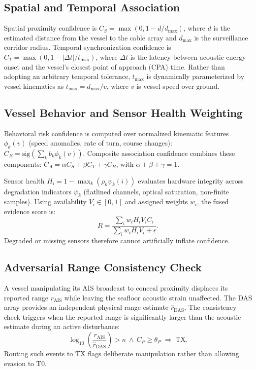 \documentclass[conference]{IEEEtran}
\newcommand{\dstate}[1]{\ensuremath{\mathrm{#1}}}
\begin{document}
\subsection{Spatial and Temporal Association}
Spatial proximity confidence is $C_S = \max(0, 1 - d/d_{\max})$, where $d$ is
the estimated distance from the vessel to the cable array and $d_{\max}$ is the
surveillance corridor radius. Temporal synchronization confidence is
$C_T = \max(0, 1 - |\Delta t| / t_{\max})$, where $\Delta t$ is the latency
between acoustic energy onset and the vessel's closest point of approach
(CPA) time. Rather than adopting an
arbitrary temporal tolerance, $t_{\max}$ is dynamically parameterized by vessel
kinematics as $t_{\max} = d_{\max} / v$, where $v$ is vessel speed over ground.

\subsection{Vessel Behavior and Sensor Health Weighting}
Behavioral risk confidence is computed over normalized kinematic features
$\phi_k(v)$ (speed anomalies, rate of turn, course changes):
$C_B = \mathrm{sig}\!\left(\sum_k b_k \phi_k(v)\right)$. Composite association
confidence combines these components: $C_A = \alpha C_S + \beta C_T + \gamma C_B$,
with $\alpha + \beta + \gamma = 1$.

Sensor health $H_i = 1 - \max_k(\rho_k \psi_k(i))$ evaluates hardware integrity
across degradation indicators $\psi_k$ (flatlined channels, optical saturation,
non-finite samples). Using availability $V_i \in [0, 1]$ and assigned weights
$w_i$, the fused evidence score is:
\begin{equation}
R = \frac{\sum_i w_i H_i V_i C_i}{\sum_i w_i H_i V_i + \epsilon}.
\end{equation}
Degraded or missing sensors therefore cannot artificially inflate confidence.

\subsection{Adversarial Range Consistency Check}
A vessel manipulating its AIS broadcast to conceal proximity displaces its
reported range $r_{\mathrm{AIS}}$ while leaving the seafloor acoustic strain
unaffected. The DAS array provides an independent physical range estimate
$\hat{r}_{\mathrm{DAS}}$. The consistency check triggers when the reported range
is significantly larger than the acoustic estimate during an active disturbance:
\begin{equation}
\log_{10}\!\left(\frac{r_{\mathrm{AIS}}}{\hat{r}_{\mathrm{DAS}}}\right) > \kappa
\ \wedge\ C_P \geq \theta_P \;\Rightarrow\; \dstate{TX}.
\label{eq:consistency}
\end{equation}
Routing such events to \dstate{TX} flags deliberate manipulation rather than
allowing evasion to \dstate{T0}.
\end{document}
